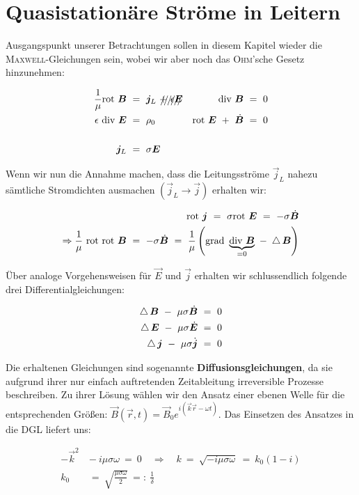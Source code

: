 \section{Quasistationäre Ströme in Leitern}

Ausgangspunkt unserer Betrachtungen sollen in diesem Kapitel wieder die \textsc{Maxwell}-Gleichungen sein, wobei wir aber noch das \textsc{Ohm}'sche Gesetz hinzunehmen:

\begin{align*}
\frac{1}{\mu}\rot\vec{B}  \ &= \ \vec{j}_L \ \xout{+ \ \epsilon\vec{E}}  & \div\vec{B}  \ &= \ 0\\
\epsilon \ \div\vec{E} \ &= \ \rho_0  & \rot\vec{E} \ + \ \dot{\vec{B}} \ &= \ 0\\
\ \\
\vec{j}_L \ &= \ \sigma \vec{E}
\end{align*}

Wenn wir nun die Annahme machen, dass die Leitungsströme $\vec{j}_L$ nahezu sämtliche Stromdichten ausmachen $(\vec{j}_L\rightarrow\vec{j})$ erhalten wir:

\begin{align*}
\rot \vec{j} \ = \ \sigma \rot\vec{E}  \ = \ -\sigma\dot{\vec{B}}\\
\Rightarrow \frac{1}{\mu} \ \rot\rot \vec{B} \ = \ -\sigma \dot{\vec{B}}  \ = \ \frac{1}{\mu}\left(\grad\underbrace{\div\vec{B}}_{=0} \ - \ \laplace\vec{B}\right)
\end{align*}

Über analoge Vorgehensweisen für $\vec{E}$ und $\vec{j}$ erhalten wir schlussendlich folgende drei Differentialgleichungen:

\begin{align*}
\mathop{{}\bigtriangleup}\nolimits \bm{B} \ - \ \mu\sigma\dot{\bm{B}} \ &= \ 0\\
\mathop{{}\bigtriangleup}\nolimits \bm{E} \ - \ \mu\sigma\dot{\bm{E}} \ &= \ 0\\
\mathop{{}\bigtriangleup}\nolimits \bm{j} \ - \ \mu\sigma\dot{\bm{j}} \ &= \ 0
\end{align*}

Die erhaltenen Gleichungen sind sogenannte \textbf{Diffusionsgleichungen}, da sie aufgrund ihrer nur einfach auftretenden Zeitableitung irreversible Prozesse beschreiben. Zu ihrer Lösung wählen wir den Ansatz einer ebenen Welle für die entsprechenden Größen: $\vec{B}(\vec{r},t)= \vec{B}_0 e^{i(\vec{k}\vec{r}-\omega t)}$. Das Einsetzen des Ansatzes in die DGL liefert uns:

\begin{align*}
-\vec{k}^2 \ &- \ i\mu\sigma\omega  \ = \ 0 \quad \Rightarrow \quad k  \ = \ \sqrt{-i\mu\sigma\omega} \ = \ k_0(1-i)\\
k_0  \ &= \ \sqrt{\frac{\mu\sigma\omega}{2}} \ =: \ \frac{1}{\delta}
\end{align*}

